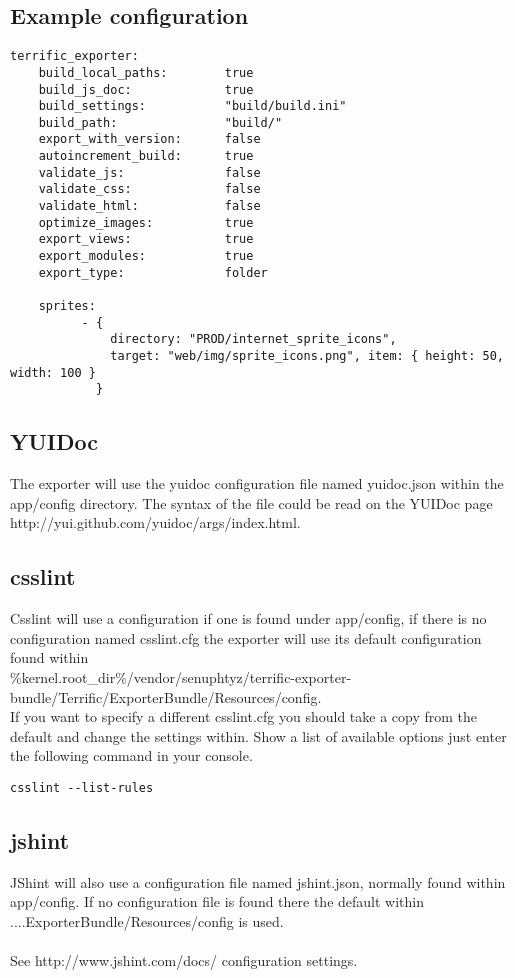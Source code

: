 \newpage
\subsection{Example configuration}

\begin{verbatim}
terrific_exporter:
	build_local_paths:        true
	build_js_doc:             true
	build_settings:           "build/build.ini"
	build_path:               "build/"
	export_with_version:      false
	autoincrement_build:      true
	validate_js:              false
	validate_css:             false
	validate_html:            false
	optimize_images:          true
	export_views:             true
	export_modules:           true
	export_type:              folder

	sprites:
	      - {
	      	  directory: "PROD/internet_sprite_icons",
	      	  target: "web/img/sprite_icons.png", item: { height: 50, width: 100 }
	      	}

\end{verbatim}

\subsection{YUIDoc}
The exporter will use the yuidoc configuration file named yuidoc.json within the app/config directory. The syntax of the file could be read on the YUIDoc page http://yui.github.com/yuidoc/args/index.html.

\subsection{csslint}
Csslint will use a configuration if one is found under app/config, if there is no configuration named csslint.cfg the exporter will use its default configuration found within\\
\%kernel.root\_dir\%/vendor/senuphtyz/terrific-exporter-bundle/Terrific/ExporterBundle/Resources/config. \\

If you want to specify a different csslint.cfg you should take a copy from the default and change the settings within. Show a list of available options just enter the following command in your console.

\begin{verbatim}
csslint --list-rules
\end{verbatim}

\subsection{jshint}
JShint will also use a configuration file named jshint.json, normally found within app/config. If no configuration file is found there the default within ....ExporterBundle/Resources/config is used.\\
\\
See http://www.jshint.com/docs/ configuration settings.\\

